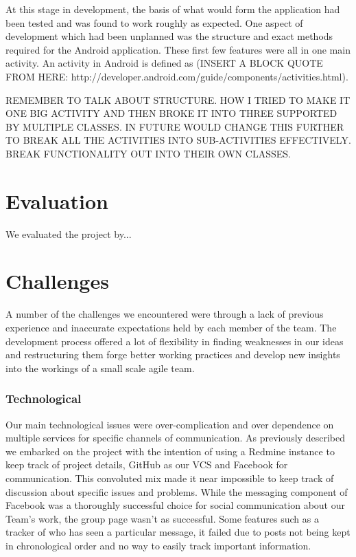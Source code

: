\documentclass{l3proj}
\begin{document}
At this stage in development, the basis of what would form the application had
been tested and was found to work roughly as expected. One aspect of development
which had been unplanned was the structure and exact methods required for the
Android application. These first few features were all in one main activity. An
activity in Android is defined as (INSERT A BLOCK QUOTE FROM HERE:
http://developer.android.com/guide/components/activities.html).

REMEMBER TO TALK ABOUT STRUCTURE. HOW I TRIED TO MAKE IT ONE BIG ACTIVITY AND
THEN BROKE IT INTO THREE SUPPORTED BY MULTIPLE CLASSES. IN FUTURE WOULD CHANGE
THIS FURTHER TO BREAK ALL THE ACTIVITIES INTO SUB-ACTIVITIES EFFECTIVELY. BREAK
FUNCTIONALITY OUT INTO THEIR OWN CLASSES.

\chapter{Evaluation}

We evaluated the project by...

\chapter{Challenges}
\label{Challenges}

A number of the challenges we encountered were through a lack of previous
experience and inaccurate expectations held by each member of the team. The
development process offered a lot of flexibility in finding weaknesses in our
ideas and restructuring them forge better working practices and develop new
insights into the workings of a small scale agile team.

\subsection{Technological}

Our main technological issues were over-complication
and over dependence on multiple services for specific channels of communication.
As previously described we embarked on the project with the intention of using a
Redmine instance to keep track of project details, GitHub as our VCS and
Facebook for communication. This convoluted mix made it near impossible to keep
track of discussion about specific issues and problems. While the messaging
component of Facebook was a thoroughly successful choice for social
communication about our Team's work, the group page wasn't as successful. Some
features such as a tracker of who has seen a particular message, it failed due
to posts not being kept in chronological order and no way to easily track
important information.
\end{document}
